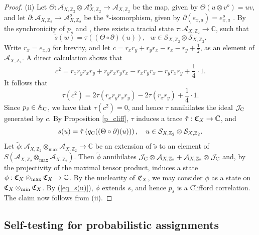 \documentclass[11pt]{amsart}
\theoremstyle{definition}
\newcommand{\cl}[1]{\mathcal{#1}}
\newcommand{\bb}[1]{\mathbb{#1}}
\begin{document}
\begin{proof}
(ii) 
Let $\Theta : \cl A_{X,\bb{Z}_2}\otimes\cl A_{X,\bb{Z}_2}^o \to \cl A_{X,\bb{Z}_2}$ be the map, given by 
$\Theta(u\otimes v^o) = uv$, and 
let $\partial : \cl A_{X,\bb{Z}_2}\to \cl A_{X,\bb{Z}_2}^o$ be the *-isomorphism, given by 
$\partial(e_{x,a}) =  e_{x,a}^o$ \cite{kps}. 
By the synchronicity of $p_{\tilde{s}}$ and \cite{psstw}, there exists a tracial state $\tau : \cl A_{X,\bb{Z}_2}\to \bb{C}$, such that
$$\tilde{s}(w) = \tau\left((\Theta\circ \partial)(u)\right), \ \ \ w\in \cl S_{X,\bb{Z}_2}\otimes \cl S_{X,\bb{Z}_2}.$$
Write $r_x = e_{x,0}$ for brevity, and let 
$c = r_{x} r_{y} + r_{y} r_{x}  - r_{x} - r_{y} + \frac{1}{2}$, as an element of 
$\cl A_{X,\bb{Z}_2}$. 
A direct calculation shows that 
$$c^2 = r_xr_yr_xr_y + r_yr_xr_yr_x - r_xr_yr_x - r_yr_xr_y + \frac{1}{4}\cdot 1.$$
It follows that 
$$\tau(c^2) = 2 \tau(r_xr_yr_xr_y)  - 2 \tau(r_xr_y) + \frac{1}{4}\cdot 1.$$
Since $p_{\tilde{s}} \in \bb{A}_{\rm C}$, we have that $\tau(c^2) = 0$, and hence 
$\tau$ annihilates the ideal $\cl J_{\rm C}$ generated by $c$. 
By Proposition \ref{p_cliff}, 
$\tau$ induces a trace $\tilde{\tau} : \frak{C}_X\to \bb{C}$, 
and 
\begin{equation}\label{eq_s(u)}
s(u) = \tilde{\tau}\left(q_{\rm C}((\Theta\circ \partial)(u))\right), \ \ \ u\in \cl S_{X,\bb{Z}_2}\otimes \cl S_{X,\bb{Z}_2}.
\end{equation}
Let $\tilde{\phi} : \cl A_{X,\bb{Z}_2}\otimes_{\max} 
\cl A_{X,\bb{Z}_2}\to \bb{C}$ be an extension of $\tilde{s}$ to 
an element of $S(\cl A_{X,\bb{Z}_2}\otimes_{\max} 
\cl A_{X,\bb{Z}_2})$. Then 
$\tilde{\phi}$ annihilates $\cl J_{\rm C}\otimes \cl A_{X,\bb{Z}_2} 
+ \cl A_{X,\bb{Z}_2}\otimes \cl J_{\rm C}$ and, 
by the projectivity of the maximal tensor product, 
induces a state 
$\phi : \frak{C}_X\otimes_{\max} \frak{C}_X\to \bb{C}$. 
By the nuclearity of $\frak{C}_X$, we may consider $\phi$ as 
a state on $\frak{C}_X\otimes_{\min} \frak{C}_X$.
By (\ref{eq_s(u)}), $\phi$ extends $s$, and hence $p_{\tilde{s}}$ is a 
Clifford correlation. 
The claim now follows from (ii). 
\end{proof}








\subsection{Self-testing for probabilistic assignments}
\label{ss_probassicont}
\end{document}
